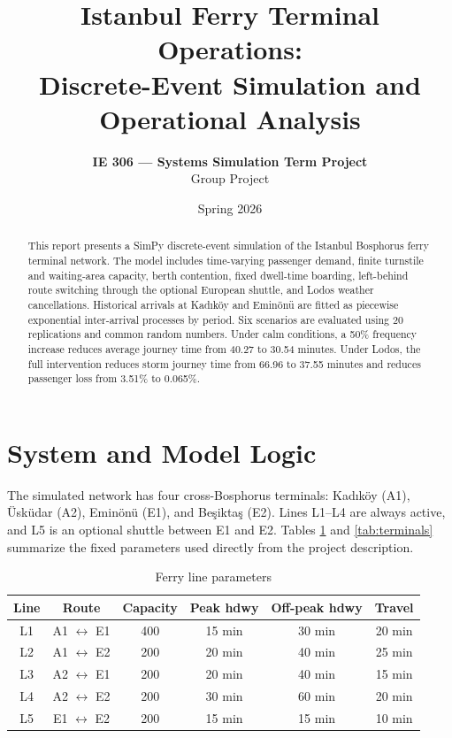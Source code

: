 \documentclass[11pt,a4paper]{article}
\title{\textbf{Istanbul Ferry Terminal Operations: \\ Discrete-Event Simulation and Operational Analysis}}
\author{\textbf{IE 306 --- Systems Simulation Term Project} \\ Group Project}
\date{Spring 2026}
\begin{document}
\maketitle

\begin{abstract}
This report presents a SimPy discrete-event simulation of the Istanbul Bosphorus ferry terminal network. The model includes time-varying passenger demand, finite turnstile and waiting-area capacity, berth contention, fixed dwell-time boarding, left-behind route switching through the optional European shuttle, and Lodos weather cancellations. Historical arrivals at Kad\i k\"{o}y and Emin\"{o}n\"{u} are fitted as piecewise exponential inter-arrival processes by period. Six scenarios are evaluated using 20 replications and common random numbers. Under calm conditions, a 50\% frequency increase reduces average journey time from 40.27 to 30.54 minutes. Under Lodos, the full intervention reduces storm journey time from 66.96 to 37.55 minutes and reduces passenger loss from 3.51\% to 0.065\%.
\end{abstract}

\section{System and Model Logic}
The simulated network has four cross-Bosphorus terminals: Kad\i k\"{o}y (A1), \"Usk\"{u}dar (A2), Emin\"{o}n\"{u} (E1), and Be\c{s}ikta\c{s} (E2). Lines L1--L4 are always active, and L5 is an optional shuttle between E1 and E2. Tables \ref{tab:ferry_lines} and \ref{tab:terminals} summarize the fixed parameters used directly from the project description.

\begin{table}[H]
\centering
\caption{Ferry line parameters}
\label{tab:ferry_lines}
\begin{tabular}{cccccc}
\toprule
\textbf{Line} & \textbf{Route} & \textbf{Capacity} & \textbf{Peak hdwy} & \textbf{Off-peak hdwy} & \textbf{Travel} \\
\midrule
L1 & A1 $\leftrightarrow$ E1 & 400 & 15 min & 30 min & 20 min \\
L2 & A1 $\leftrightarrow$ E2 & 200 & 20 min & 40 min & 25 min \\
L3 & A2 $\leftrightarrow$ E1 & 200 & 20 min & 40 min & 15 min \\
L4 & A2 $\leftrightarrow$ E2 & 200 & 30 min & 60 min & 20 min \\
L5 & E1 $\leftrightarrow$ E2 & 200 & 15 min & 15 min & 10 min \\
\bottomrule
\end{tabular}
\end{table}
\end{document}
